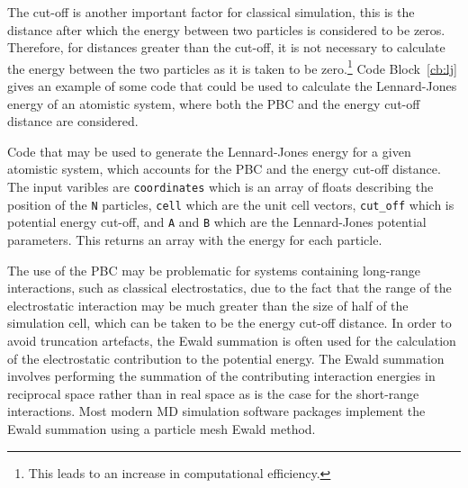 The cut-off is another important factor for classical simulation, this is the distance after which the energy between two particles is considered to be zeros.
Therefore, for distances greater than the cut-off, it is not necessary to calculate the energy between the two particles as it is taken to be zero.\footnote{This leads to an increase in computational efficiency.}
Code Block~\ref{cb:lj} gives an example of some code that could be used to calculate the Lennard-Jones energy of an atomistic system, where both the PBC and the energy cut-off distance are considered.
%
\begin{listing}[b]
    \forcerectofloat
    \centering
    \caption{Code that may be used to generate the Lennard-Jones energy for a given atomistic system, which accounts for the PBC and the energy cut-off distance. The input varibles are \texttt{coordinates} which is an array of floats describing the position of the \texttt{N} particles, \texttt{cell} which are the unit cell vectors, \texttt{cut\_off} which is potential energy cut-off, and \texttt{A} and \texttt{B} which are the Lennard-Jones potential parameters. This returns an array with the energy for each particle.}
    
    \label{cb:lj}
\end{listing}
%

The use of the PBC may be problematic for systems containing long-range interactions, such as classical electrostatics, due to the fact that the range of the electrostatic interaction may be much greater than the size of half of the simulation cell, which can be taken to be the energy cut-off distance.
In order to avoid truncation artefacts, the Ewald summation is often used for the calculation of the electrostatic contribution to the potential energy.\autocite{ewald_berechnung_1921}
The Ewald summation involves performing the summation of the contributing interaction energies in reciprocal space rather than in real space as is the case for the short-range interactions.
Most modern MD simulation software packages implement the Ewald summation using a particle mesh Ewald method.\autocite{essmann_smooth_1995}

